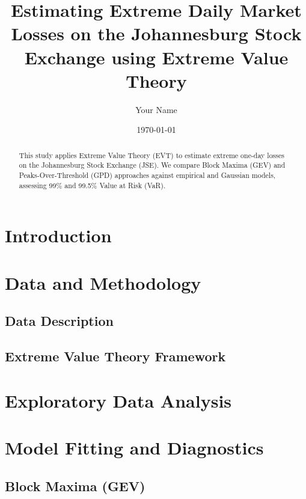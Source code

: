 \documentclass[12pt, a4paper]{article}
\title{Estimating Extreme Daily Market Losses on the Johannesburg Stock Exchange using Extreme Value Theory}
\author{Your Name}
\date{\today}
\begin{document}
\maketitle

\begin{abstract}
This study applies Extreme Value Theory (EVT) to estimate extreme one-day losses on the Johannesburg Stock Exchange (JSE). We compare Block Maxima (GEV) and Peaks-Over-Threshold (GPD) approaches against empirical and Gaussian models, assessing 99\% and 99.5\% Value at Risk (VaR). 
\end{abstract}

\section{Introduction}

\section{Data and Methodology}
\subsection{Data Description}

\subsection{Extreme Value Theory Framework}

\section{Exploratory Data Analysis}

\section{Model Fitting and Diagnostics}
\subsection{Block Maxima (GEV)}
\end{document}
